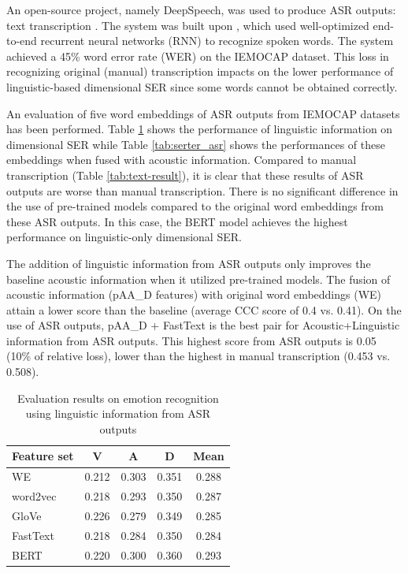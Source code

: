 An open-source project, namely DeepSpeech, was used to produce ASR outputs:
text transcription \cite{DeepSpeech2019}. The system was built upon
\cite{Hannun2014}, which used well-optimized end-to-end recurrent neural
networks (RNN) to recognize spoken words. The system achieved a 45\% word error
rate (WER) on the IEMOCAP dataset. This loss in recognizing original (manual)
transcription impacts on the lower performance of linguistic-based dimensional
SER since some words cannot be obtained correctly.

An evaluation of five word embeddings of ASR outputs from IEMOCAP datasets has
been performed. Table \ref{tab:ter_asr} shows the performance of linguistic
information on dimensional SER while Table \ref{tab:serter_asr} shows the
performances of these embeddings when fused with acoustic information. Compared
to manual transcription (Table \ref{tab:text-result}), it is clear that these
results of ASR outputs are worse than manual transcription. There is no
significant difference in the use of pre-trained models compared to the
original word embeddings from these ASR outputs. In this case, the BERT model
achieves the highest performance on linguistic-only dimensional SER.

The addition of linguistic information from ASR outputs only improves the
baseline acoustic information when it utilized pre-trained models. The fusion
of acoustic information (pAA\_D features) with original word embeddings (WE)
attain a lower score than the baseline (average CCC score of 0.4 vs. 0.41). On
the use of ASR outputs, pAA\_D + FastText is the best pair for
Acoustic+Linguistic information from ASR outputs. This highest score from ASR
outputs is 0.05 (10\% of relative loss), lower than the highest in manual
transcription (0.453 vs. 0.508).


\begin{table}[htbp]
  \caption{Evaluation results on emotion recognition using linguistic information from ASR outputs}
  \begin{center}
  \begin{tabular}{l | c c c c}
  \hline
Feature set & V & A & D & Mean \\
\hline \hline
WE        & 0.212 & 0.303 & 0.351 & 0.288 \\
word2vec  & 0.218 & 0.293 & 0.350 & 0.287 \\
GloVe     & 0.226 & 0.279 & 0.349 & 0.285 \\
FastText  & 0.218 & 0.284 & 0.350 & 0.284 \\
BERT      & 0.220 & 0.300 & 0.360 & 0.293 \\
  \hline
  \end{tabular}
  \label{tab:ter_asr}
  \end{center}
\end{table}

